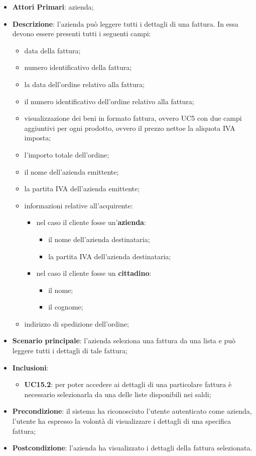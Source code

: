\begin{itemize}
	\item \textbf{Attori Primari}: azienda;
	\item \textbf{Descrizione}: l'azienda può leggere tutti i dettagli di una fattura. In essa devono essere presenti tutti i seguenti campi:
	\begin{itemize}
		\item data della fattura;
		\item numero identificativo della fattura;
		\item la data dell'ordine relativo alla fattura;
		\item il numero identificativo dell'ordine relativo alla fattura;
		\item visualizzazione dei beni in formato fattura, ovvero UC5 con due campi aggiuntivi per ogni prodotto, ovvero il prezzo netto\glosp e la aliquota IVA imposta;
		\item l'importo totale dell'ordine;
		\item il nome dell'azienda emittente;
		\item la partita IVA dell'azienda emittente;
		\item informazioni relative all'acquirente:
		\begin{itemize}
			\item nel caso il cliente fosse un'\textbf{azienda}:
			\begin{itemize}
				\item il nome dell'azienda destinataria;
				\item la partita IVA dell'azienda destinataria;
			\end{itemize}
			\item nel caso il cliente fosse un \textbf{cittadino}:
			\begin{itemize}
				\item il nome;
				\item il cognome;
			\end{itemize}
		\end{itemize}
		
		\item indirizzo di spedizione dell'ordine;
	\end{itemize}
	\item \textbf{Scenario principale}: l'azienda seleziona una fattura da una lista e può leggere tutti i dettagli di tale fattura;
	\item \textbf{Inclusioni}:
	\begin{itemize}
		\item \textbf{UC15.2}: per poter accedere ai dettagli di una particolare fattura è necessario selezionarla da una delle liste disponibili nei saldi;
	\end{itemize}
	\item \textbf{Precondizione}: il sistema ha riconosciuto l'utente autenticato come azienda, l'utente ha espresso la volontà di visualizzare i dettagli di una specifica fattura;
	\item \textbf{Postcondizione}: l'azienda ha visualizzato i dettagli della fattura selezionata.
\end{itemize} 


